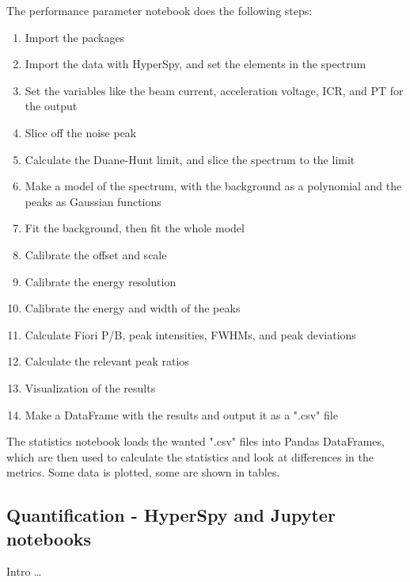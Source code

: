 




The performance parameter notebook does the following steps:

\begin{enumerate}
    \item Import the packages
    \item Import the data with HyperSpy, and set the elements in the spectrum
    \item Set the variables like the beam current, acceleration voltage, ICR, and PT for the output
    \item Slice off the noise peak
    \item Calculate the Duane-Hunt limit, and slice the spectrum to the limit
    \item Make a model of the spectrum, with the background as a polynomial and the peaks as Gaussian functions
    \item Fit the background, then fit the whole model
    \item Calibrate the offset and scale
    \item Calibrate the energy resolution
    \item Calibrate the energy and width of the peaks
    \item Calculate Fiori P/B, peak intensities, FWHMs, and peak deviations
    \item Calculate the relevant peak ratios
    \item Visualization of the results
    \item Make a DataFrame with the results and output it as a ".csv" file
\end{enumerate}



The statistics notebook loads the wanted ".csv" files into Pandas DataFrames, which are then used to calculate the statistics and look at differences in the metrics.
Some data is plotted, some are shown in tables.




















\subsection{Quantification - HyperSpy and Jupyter notebooks}
\label{method:data_treatment:quantification}


Intro \dots



